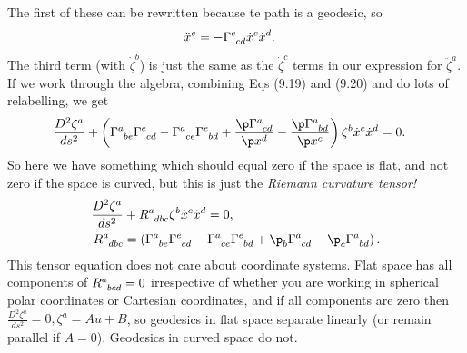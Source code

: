 \documentclass[a4paper, 11pt, normalem]{report}
\begin{document}
The first of these can be rewritten because te path is a geodesic, so
\begin{align}
    \ddot{x}^e &= -\tensor{\Gamma}{^e_{cd}}\dot{x}^c\dot{x}^d.
\end{align}
The third term (with $\dot{\zeta}^b$) is just the same as the $\dot{\zeta}^c$ terms in our expression for $\ddot{\zeta}^a$.
If we work through the algebra, combining Eqs (9.19) and (9.20) and do lots of relabelling, we get
\begin{align}
    \frac{D^2\zeta^a}{ds^2} + \left(\tensor{\Gamma}{^a_{be}}\tensor{\Gamma}{^e_{cd}} - \tensor{\Gamma}{^a_{ce}}\tensor{\Gamma}{^e_{bd}} + \frac{\p\tensor{\Gamma}{^a_{cd}}}{\p x^d} - \frac{\p\tensor{\Gamma}{^a_{bd}}}{\p x^c}\right)\zeta^b\dot{x}^c\dot{x}^d &= 0.
\end{align}
So here we have something which should equal zero if the space is flat, and not zero if the space is curved, but this is just the \emph{Riemann curvature tensor!}
\begin{align}
    \frac{D^2\zeta^a}{ds^2} &+ \tensor{R}{^a_{dbc}}\zeta^b\dot{x}^c\dot{x}^d = 0, \\
    \tensor{R}{^a_{dbc}} &= \left(\tensor{\Gamma}{^a_{be}}\tensor{\Gamma}{^e_{cd}} - \tensor{\Gamma}{^a_{ce}}\tensor{\Gamma}{^e_{bd}} + \p_b\tensor{\Gamma}{^a_{cd}} - \p_c\tensor{\Gamma}{^a_{bd}}\right).
\end{align}
This tensor equation does not care about coordinate systems. 
Flat space has all components of $\tensor{R}{^a_{bcd}}=0$ irrespective of whether you are working in spherical polar coordinates or Cartesian coordinates, and if all components are zero then $\frac{D^2\zeta^a}{ds^2}=0,\zeta^a=Au+B$, so geodesics in flat space separate linearly (or remain parallel if $A=0$).
Geodesics in curved space do not. 
\end{document}
